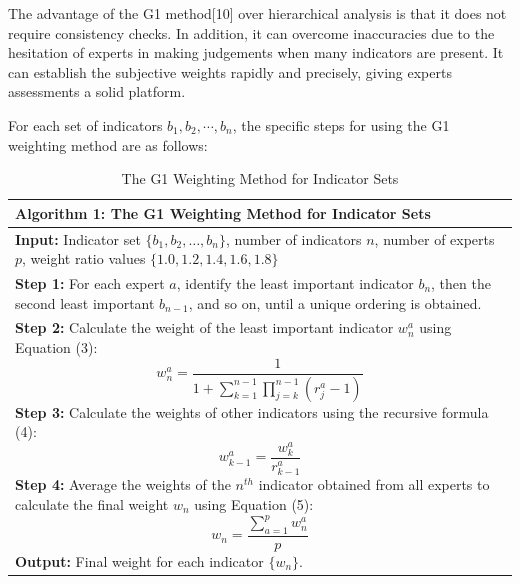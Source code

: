 \documentclass[12pt]{article}  %
\begin{document}
The advantage of the G1 method[10] over hierarchical analysis is that it does not require consistency checks. In addition, it can overcome inaccuracies due to the hesitation of experts in making judgements when many indicators are present. It can establish the subjective weights rapidly and precisely, giving experts assessments a solid platform.

For each set of indicators \( b_1, b_2, \cdots, b_n \), the specific steps for using the G1 weighting method are as follows:

\begin{table}[H]
	\centering
	\caption{The G1 Weighting Method for Indicator Sets}
	\label{my-label}
	\begin{tabular}{@{}p{}@{}}
	\toprule
	\textbf{Algorithm 1: The G1 Weighting Method for Indicator Sets} \\ \midrule
	\textbf{Input:} Indicator set \( \{b_1, b_2, \ldots, b_n\} \), number of indicators \( n \), number of experts \( p \), weight ratio values \( \{1.0, 1.2, 1.4, 1.6, 1.8\} \) \\
	\textbf{Step 1:} For each expert \( a \), identify the least important indicator \( b_n \), then the second least important \( b_{n-1} \), and so on, until a unique ordering is obtained. \\
	\textbf{Step 2:} Calculate the weight of the least important indicator \( w_n^a \) using Equation (3): 
    \begin{equation}
        w_n^a = \frac{1}{1 + \sum_{k=1}^{n-1}\prod_{j=k}^{n-1}(r_j^a - 1)}
    \end{equation}
	\textbf{Step 3:} Calculate the weights of other indicators using the recursive formula (4): 
    \begin{equation}
        w_{k-1}^a = \frac{w_k^a}{r_{k-1}^a}
    \end{equation}
	\textbf{Step 4:} Average the weights of the \( n^{th} \) indicator obtained from all experts to calculate the final weight \( w_n \) using Equation (5): 
    \begin{equation}
        w_n = \frac{\sum_{a=1}^{p}w_n^a}{p}
    \end{equation}
	\textbf{Output:} Final weight for each indicator \( \{w_n\} \). \\ \bottomrule
	\end{tabular}
\end{table}
\end{document}

